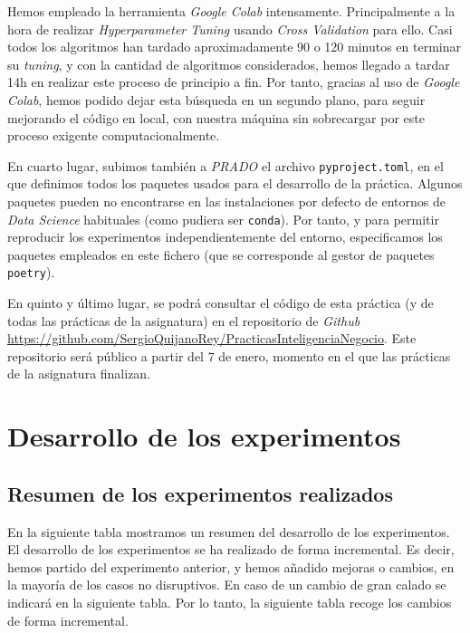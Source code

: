 \documentclass[11pt]{article}
\begin{document}
Hemos empleado la herramienta \emph{Google Colab} intensamente. Principalmente a la hora de realizar \emph{Hyperparameter Tuning} usando \emph{Cross Validation} para ello. Casi todos los algoritmos han tardado aproximadamente 90 o 120 minutos en terminar su \emph{tuning}, y con la cantidad de algoritmos considerados, hemos llegado a tardar 14h en realizar este proceso de principio a fin. Por tanto, gracias al uso de \emph{Google Colab}, hemos podido dejar esta búsqueda en un segundo plano, para seguir mejorando el código en local, con nuestra máquina sin sobrecargar por este proceso exigente computacionalmente.

En cuarto lugar, subimos también a \emph{PRADO} el archivo \lstinline{pyproject.toml}, en el que definimos todos los paquetes usados para el desarrollo de la práctica. Algunos paquetes pueden no encontrarse en las instalaciones por defecto de entornos de \emph{Data Science} habituales (como pudiera ser \lstinline{conda}). Por tanto, y para permitir reproducir los experimentos independientemente del entorno, especificamos los paquetes empleados en este fichero (que se corresponde al gestor de paquetes \lstinline{poetry}).

En quinto y último lugar, se podrá consultar el código de esta práctica (y de todas las prácticas de la asignatura) en el repositorio de \emph{Github} \url{https://github.com/SergioQuijanoRey/PracticasInteligenciaNegocio}. Este repositorio será público a partir del 7 de enero, momento en el que las prácticas de la asignatura finalizan.

\pagebreak

\section{Desarrollo de los experimentos}

\subsection{Resumen de los experimentos realizados}

En la siguiente tabla mostramos un resumen del desarrollo de los experimentos. El desarrollo de los experimentos se ha realizado de forma incremental. Es decir, hemos partido del experimento anterior, y hemos añadido mejoras o cambios, en la mayoría de los casos no disruptivos. En caso de un cambio de gran calado se indicará en la siguiente tabla. Por lo tanto, la siguiente tabla recoge los cambios de forma incremental.
\end{document}
